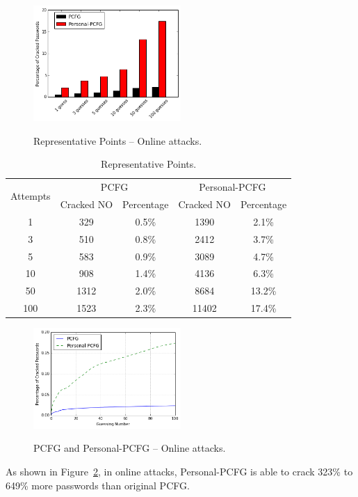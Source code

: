 \begin{figure}[h!]
\centering
  \caption{Representative Points -- Online attacks.}{}
  \label{online}
  \centering
    \includegraphics[width=0.5\textwidth]{fig/online}
\end{figure}

\begin{table}
\centering
\caption{Representative Points.}
\begin{adjustbox}{max width=0.48\textwidth}
\begin{tabular}{|c|c|c|c|c|} \hline
\multirow{2}{*}{Attempts}&\multicolumn{2}{|c|}{PCFG}&\multicolumn{2}{|c|}{Personal-PCFG}\\ \cline{2-5}
&Cracked NO&Percentage&Cracked NO&Percentage\\ \hline
1 & 329 & 0.5\% & 1390 & 2.1\% \\
3 & 510 & 0.8\% & 2412 & 3.7\%\\
5 & 583 & 0.9\% & 3089 & 4.7\%\\
10 & 908 & 1.4\% & 4136 & 6.3\%\\
50 & 1312 & 2.0\% & 8684 & 13.2\%\\
100 & 1523 & 2.3\% & 11402 & 17.4\%\\
\hline\end{tabular}
\end{adjustbox}
\label{cmp100t}
\end{table}

\begin{figure}[h!]
\centering
  \caption{PCFG and Personal-PCFG -- Online attacks.}{}
  \label{cmp100}
  \centering
    \includegraphics[width=0.5\textwidth]{fig/cmp100}
\end{figure}

As shown in Figure~\ref{cmp100}, in online attacks, Personal-PCFG is able to crack 323\% to 649\% more passwords than original PCFG. 
